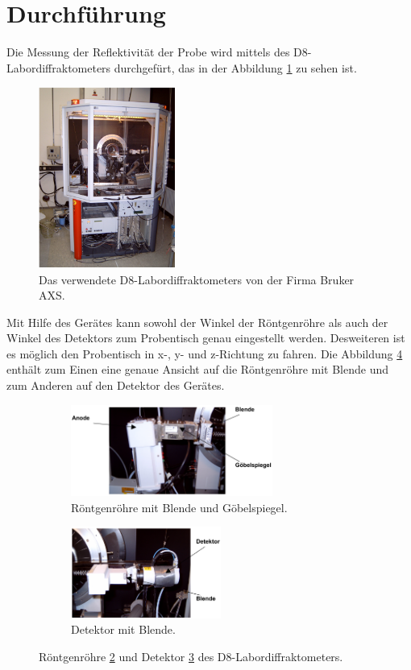 \section{Durchführung}
\label{sec:Durchführung}
Die Messung der Reflektivität der Probe wird mittels
des D8-Labordiffraktometers
durchgefürt, das in der Abbildung \ref{fig:app} zu sehen ist.
\begin{figure}
  \centering
  \includegraphics[width=0.4\textwidth]{bilder/apparatur.PNG}
  \caption{Das verwendete D8-Labordiffraktometers von der Firma Bruker AXS. \cite{sample}}
  \label{fig:app}
\end{figure}

Mit Hilfe des Gerätes kann sowohl der
Winkel der Röntgenröhre
als auch der Winkel des Detektors zum Probentisch
genau eingestellt werden. Desweiteren ist es
möglich den Probentisch in x-, y- und z-Richtung zu fahren.
Die Abbildung \ref{fig:anode_det} enthält zum Einen eine genaue Ansicht auf die
Röntgenröhre mit Blende und zum Anderen auf den Detektor des Gerätes.

\begin{figure}
  \centering
  \begin{subfigure}{0.59\textwidth}
  \includegraphics[height=3cm]{bilder/anode.PNG}
  \caption{Röntgenröhre mit Blende und Göbelspiegel.}
  \label{fig:anode}
\end{subfigure}
\begin{subfigure}{0.39\textwidth}
\includegraphics[height=3cm]{bilder/detektor.PNG}
\caption{Detektor mit Blende.}
\label{fig:det}
\end{subfigure}
\caption{Röntgenröhre \ref{fig:anode} und Detektor \ref{fig:det} des D8-Labordiffraktometers. \cite{sample}}
\label{fig:anode_det}
\end{figure}

